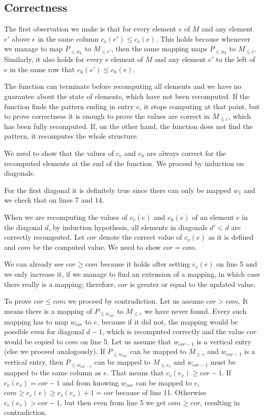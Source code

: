 \subsection{Correctness}
The first observation we make is that for every element $e$ of $M$ and any element $e'$ above $e$ in the same column $c_v(e')\leq c_v(e)$. This holds because whenever we manage to map $P_{\leq w_k}$ to $M_{\leq e'}$, then the same mapping maps $P_{\leq w_k}$ to $M_{\leq e}$. Similarly, it also holds for every $e$ element of $M$ and any element $e'$ to the left of $e$ in the same row that $c_h(e')\leq c_h(e)$.

The function can terminate before recomputing all elements and we have no guarantee about the state of elements, which have not been recomputed. If the function finds the pattern ending in entry $e$, it stops computing at that point, but to prove correctness it is enough to prove the values are correct in $M_{\leq e}$, which has been fully recomputed. If, on the other hand, the function does not find the pattern, it recomputes the whole structure.

We need to show that the values of $c_v$ and $c_h$ are always correct for the recomputed elements at the end of the function. We proceed by induction on diagonals.

For the first diagonal it is definitely true since there can only be mapped $w_1$ and we check that on lines 7 and 14.

When we are recomputing the values of $c_v(e)$ and $c_h(e)$ of an element $e$ in the diagonal $d$, by induction hypothesis, all elements in diagonals $d'<d$ are correctly recomputed. Let $cor$ denote the correct value of $c_v(e)$ as it is defined and $com$ be the computed value. We need to show $cor=com$.

We can already see $cor\geq com$ because it holds after setting $c_v(e)$ on line 5 and we only increase it, if we manage to find an extension of a mapping, in which case there really is a mapping; therefore, $cor$ is greater or equal to the updated value.

To prove $cor\leq com$ we proceed by contradiction. Let us assume $cor>com$. It means there is a mapping of $P_{\leq w_{cor}}$ to $M_{\leq e}$ we have never found. Every such mapping has to map $w_{cor}$ to $e$, because if it did not, the mapping would be possible even for diagonal $d-1$, which is recomputed correctly and the value $cor$ would be copied to $com$ on line 5. Let us assume that $w_{cor-1}$ is a vertical entry (else we proceed analogously). If $P_{\leq w_{cor}}$ can be mapped to $M_{\leq e}$ and $w_{cor-1}$ is a vertical entry, then $P_{\leq w_{cor-1}}$ can be mapped to $M_{\leq e_v}$ and $w_{cor-1}$ must be mapped to the same column as $e$. That means that $c_v(e_v)\geq cor-1$. If $c_v(e_v)=cor-1$ and from knowing $w_{cor}$ can be mapped to $e$, $com\geq c_v(e)\geq c_v(e_v)+1=cor$ because of line 11. Otherwise $c_v(e_v)>cor-1$, but then even from line 5 we get $com\geq cor$, resulting in contradiction.


